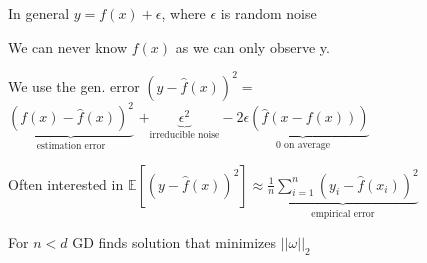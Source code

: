 In general $y = f(x) + \epsilon$, where $\epsilon$ is random noise

We can never know $f(x)$ as we can only observe y. 

We use the gen. error $(y-\hat{f}(x))^2 =$ \\$\underbrace{(f(x) - \hat{f}(x))^2}_{\text{estimation error}}$ $+ \underbrace{\epsilon^2}_{\text{irreducible noise}} - \underbrace{2\epsilon(\hat{f}(x - f(x)))}_{0 \text{ on average}}$

Often interested in $\mathbb{E}\left[(y-\hat{f}(x))^2\right] \approx \underbrace{\frac{1}{n}\sum_{i=1}^n (y_i-\hat{f}(x_i))^2}_{\text{empirical error}}$



For $n < d$ GD finds solution that minimizes $||\omega||_2$